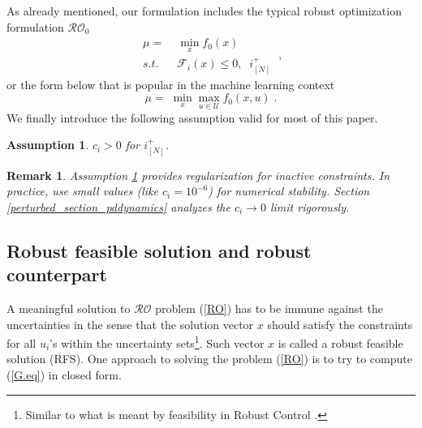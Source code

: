 \documentclass[journal,twoside,web]{ieeecolor}
\newcommand{\rev}[1]{\textcolor{revisionblue}{#1}}
\newtheorem{assumption}[theorem]{Assumption}
\newtheorem{remark}{Remark}
\begin{document}
As already mentioned, our formulation includes the typical robust optimization formulation $\mathcal{RO}_0$
\begin{equation}
\begin{array}{lcc}
\mu=&\;\displaystyle\min_x f_0(x)\\
s.t.&\; \mathcal{F}_i(x)\leq 0,\;\;i^+_{[N]}
\end{array}\;,
\label{RO3}
\end{equation}
or the form below that is popular in the machine learning context \cite{rafique2022,zhang2021}
\begin{equation}
\mu=\;\displaystyle\min_x\max_{u\in \mathcal{U}} f_0(x,u)\;.
\end{equation}
We finally introduce the following assumption valid for most of this paper.

\begin{assumption} \label{assume_c>0}
$c_i > 0$ for $i^+_{[N]}$.
\end{assumption}

\begin{remark}\label{active_inactive_constraint_rem} 
\rev{Assumption \ref{assume_c>0} provides regularization for inactive constraints. In practice, use small values (like $c_i = 10^{-6}$) for numerical stability. Section \ref{perturbed_section_pddynamics} analyzes the $c_i \to 0$ limit rigorously.}
\end{remark}

\subsection{Robust feasible solution and robust counterpart}
A meaningful solution to $\mathcal{RO}$ problem (\ref{RO}) has to be immune against the uncertainties in the sense that the solution vector $x$ should satisfy the constraints for all $u_i$'s within the uncertainty sets\footnote{Similar to what is meant by feasibility in Robust Control \cite{zhou1995}.}. Such vector $x$ is called a robust feasible solution (RFS). One approach to solving the problem (\ref{RO}) is to try to compute (\ref{G.eq}) in closed form.
\end{document}
